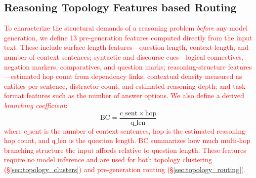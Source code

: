 \documentclass[11pt]{article}
\begin{document}
\subsection{Reasoning Topology Features based Routing}
\label{sec:topology_features}



\textcolor{red}{To characterize the structural demands of a reasoning problem \emph{before} any model generation, we define 13 pre-generation features computed directly from the input text. These include surface length features---question length, context length, and number of context sentences; syntactic and discourse cues---logical connectives, negation markers, comparatives, and question marks; reasoning-structure features---estimated hop count from dependency links, contextual density measured as entities per sentence, distractor count, and estimated reasoning depth; and task-format features such as the number of answer options. We also define a derived \emph{branching coefficient}:}
\begin{equation}
\mathrm{BC} = \frac{\mathrm{c\_sent} \times \mathrm{hop}}{\mathrm{q\_len}}
\label{eq:branching_coefficient}
\end{equation}
\textcolor{red}{where $\mathrm{c\_sent}$ is the number of context sentences, $\mathrm{hop}$ is the estimated reasoning-hop count, and $\mathrm{q\_len}$ is the question length. BC summarizes how much multi-hop branching structure the input affords relative to question length.}
\textcolor{red}{These features require no model inference and are used for both topology clustering (\S\ref{sec:topology_clusters}) and pre-generation routing (\S\ref{sec:topology_routing}).}
\end{document}
